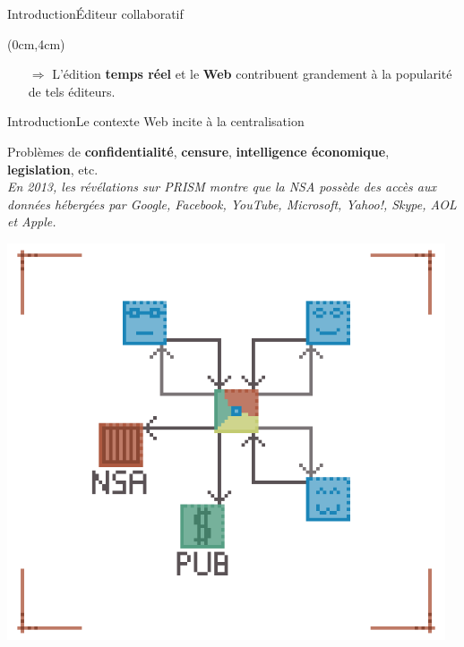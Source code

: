 \begin{frame}{Introduction}{Éditeur collaboratif}
  \begin{textblock*}{\textwidth}(0cm,4cm)
    \large
    \begin{itemize}
    \item[$\Rightarrow$] L'édition \textbf{temps réel} et le \textbf{Web}
      contribuent grandement à la popularité de tels éditeurs.
    \end{itemize}    
  \end{textblock*}
\end{frame}


\begin{frame}{Introduction}{Le contexte Web incite à la centralisation}
  
  \begin{minipage}{0.69\textwidth}
    Problèmes de \textbf{confidentialité}, \textbf{censure},
    \textbf{intelligence économique}, \textbf{legislation}, etc. \vspace{0.15cm}\\
    \small\textit{En 2013, les révélations sur PRISM montre que la NSA possède des
      accès aux données hébergées par Google, Facebook, YouTube, Microsoft,
      Yahoo!, Skype, AOL et Apple.}
  \end{minipage}
  \hfill
  \begin{minipage}{0.3\textwidth}
    \hfill
    \includegraphics[width=0.97\textwidth]{img/centralizedethicproblems.png}
  \end{minipage}


\end{frame}
